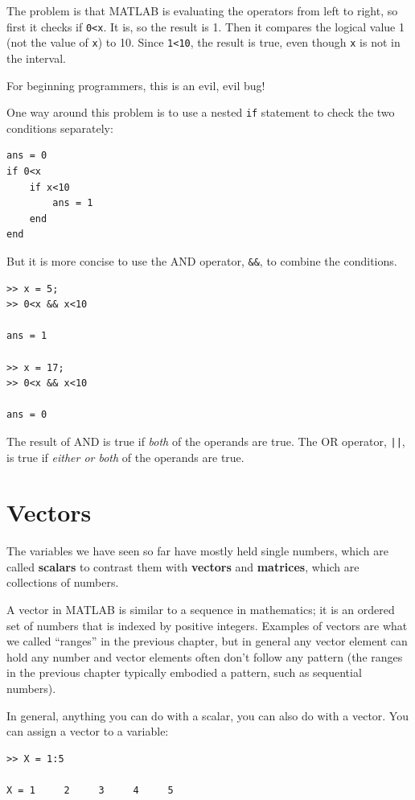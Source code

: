 \documentclass[
]{book}
\begin{document}
The problem is that MATLAB is evaluating the operators from left
to right, so first it checks if {\tt 0<x}.  It is, so the result
is 1.  Then it compares the logical value 1 (not the value of
{\tt x}) to 10.  Since {\tt 1<10}, the result is true, even though
{\tt x} is not in the interval.

For beginning programmers, this is an evil, evil bug!

One way around this problem is to use a nested {\tt if} statement to
check the two conditions separately:

\begin{verbatim}
ans = 0
if 0<x
    if x<10
        ans = 1
    end
end
\end{verbatim}

But it is more concise to use the AND operator, {\tt \&\&}, to
combine the conditions.

\begin{verbatim}
>> x = 5;
>> 0<x && x<10

ans = 1

>> x = 17;
>> 0<x && x<10

ans = 0
\end{verbatim}

The result of AND is true if {\em both} of the operands are
true.  The OR operator, {\tt ||}, is true if {\em either or both}
of the operands are true.


\section{Vectors}

The variables we have seen so far have mostly held single numbers,
which are called {\bf scalars} to contrast them with {\bf vectors}
and {\bf matrices}, which are collections of numbers.

A vector in MATLAB is similar to a sequence in mathematics;
it is an ordered set of numbers that is indexed by positive integers.
Examples of vectors are what we called ``ranges'' in the previous chapter,
but in general any vector element can hold any number and vector elements
often don't follow any pattern (the ranges in the previous chapter
typically embodied a pattern, such as sequential numbers).  

In general, anything you can do with a scalar, you can also do with
a vector.  You can assign a vector to a variable:

\begin{verbatim}
>> X = 1:5

X = 1     2     3     4     5
\end{verbatim}
\end{document}
